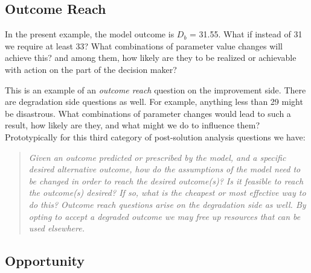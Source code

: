 \subsection{Outcome Reach\label{psa:outcome_reach}}

In the present example, the model outcome is $D_b$ = 31.55. What if instead of 31 we require at least 33? What combinations of parameter value changes will achieve this? and among them, how likely are they to be realized or achievable with action on the part of the decision maker?


This is an example of an \emph{outcome reach} question on the improvement side. There are degradation side questions as well. For example, anything less than 29 might be disastrous. What combinations of parameter changes would lead to such a result, how likely are they, and what might we do to influence them?
Prototypically for this third category of post-solution analysis questions we have:

\begin{quote}
{\it Given an outcome predicted or prescribed by the model, and a specific desired alternative outcome, how do the assumptions of the model need to be changed in order to reach the desired outcome(s)? Is it feasible to reach the outcome(s) desired? If so, what is the cheapest or most effective way to do this? Outcome reach questions arise on the degradation side as well. By opting to accept a degraded outcome we may free up resources that can be used elsewhere.}
\end{quote}

\subsection{Opportunity}

